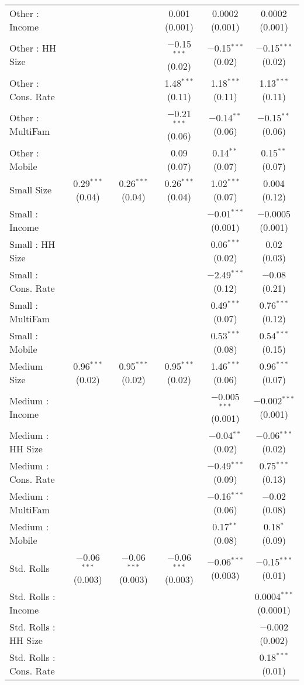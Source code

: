 \begin{table}[!htbp]
\begin{tabular}{@{\extracolsep{5pt}}lccccc}
  Other : Income &  &  & 0.001 (0.001) & 0.0002 (0.001) & 0.0002 (0.001) \\ 
  Other : HH Size &  &  & $-$0.15$^{***}$ (0.02) & $-$0.15$^{***}$ (0.02) & $-$0.15$^{***}$ (0.02) \\ 
  Other : Cons. Rate &  &  & 1.48$^{***}$ (0.11) & 1.18$^{***}$ (0.11) & 1.13$^{***}$ (0.11) \\ 
  Other : MultiFam &  &  & $-$0.21$^{***}$ (0.06) & $-$0.14$^{**}$ (0.06) & $-$0.15$^{**}$ (0.06) \\ 
  Other : Mobile &  &  & 0.09 (0.07) & 0.14$^{**}$ (0.07) & 0.15$^{**}$ (0.07) \\ 
  Small Size & 0.29$^{***}$ (0.04) & 0.26$^{***}$ (0.04) & 0.26$^{***}$ (0.04) & 1.02$^{***}$ (0.07) & 0.004 (0.12) \\ 
  Small : Income &  &  &  & $-$0.01$^{***}$ (0.001) & $-$0.0005 (0.001) \\ 
  Small : HH Size &  &  &  & 0.06$^{***}$ (0.02) & 0.02 (0.03) \\ 
  Small : Cons. Rate &  &  &  & $-$2.49$^{***}$ (0.12) & $-$0.08 (0.21) \\ 
  Small : MultiFam &  &  &  & 0.49$^{***}$ (0.07) & 0.76$^{***}$ (0.12) \\ 
  Small : Mobile &  &  &  & 0.53$^{***}$ (0.08) & 0.54$^{***}$ (0.15) \\ 
  Medium Size & 0.96$^{***}$ (0.02) & 0.95$^{***}$ (0.02) & 0.95$^{***}$ (0.02) & 1.46$^{***}$ (0.06) & 0.96$^{***}$ (0.07) \\ 
  Medium : Income &  &  &  & $-$0.005$^{***}$ (0.001) & $-$0.002$^{***}$ (0.001) \\ 
  Medium : HH Size &  &  &  & $-$0.04$^{**}$ (0.02) & $-$0.06$^{***}$ (0.02) \\ 
  Medium : Cons. Rate &  &  &  & $-$0.49$^{***}$ (0.09) & 0.75$^{***}$ (0.13) \\ 
  Medium : MultiFam &  &  &  & $-$0.16$^{***}$ (0.06) & $-$0.02 (0.08) \\ 
  Medium : Mobile &  &  &  & 0.17$^{**}$ (0.08) & 0.18$^{*}$ (0.09) \\ 
  Std. Rolls & $-$0.06$^{***}$ (0.003) & $-$0.06$^{***}$ (0.003) & $-$0.06$^{***}$ (0.003) & $-$0.06$^{***}$ (0.003) & $-$0.15$^{***}$ (0.01) \\ 
  Std. Rolls : Income &  &  &  &  & 0.0004$^{***}$ (0.0001) \\ 
  Std. Rolls : HH Size &  &  &  &  & $-$0.002 (0.002) \\ 
  Std. Rolls : Cons. Rate &  &  &  &  & 0.18$^{***}$ (0.01) \\ 

\end{tabular}
\end{table}
